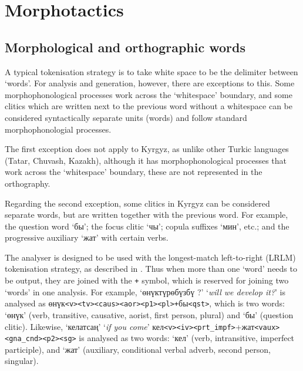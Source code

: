 \documentclass[10pt,a4paper,twocolumn]{article}
\newcommand{\eng}[1]{`{\em #1}'}
\begin{document}

\section{Morphotactics}


\subsection{Morphological and orthographic words}
A typical tokenisation strategy is to take white space to be the delimiter between `words'.  For analysis and generation, however, there are exceptions to this.  Some morphophonological processes work across the `whitespace' boundary, and some clitics which are written next to the previous word without a whitespace can be considered syntactically separate units (words) and follow standard morphophonologial processes.

The first exception does not apply to Kyrgyz, as unlike other Turkic languages (Tatar, Chuvash, Kazakh), although it has morphophonological processes that work across the `whitespace' boundary, these are not represented in the orthography.

Regarding the second exception, some clitics in Kyrgyz can be considered separate words, but are written together with the previous word. For example, the question word `бы'; the focus clitic `чы'; copula suffixes `мин', etc.; and the progressive auxiliary `жат' with certain verbs.

The analyser is designed to be used with the longest-match left-to-right (LRLM) tokenisation strategy, as described in \cite{garrido-alenda02}. Thus when more than one `word' needs to be output, they are joined with the \texttt{+} symbol, which is reserved for joining two `words' in one analysis.  For example, `өнүктүрөбүзбү ?' \eng{will we develop it?} is analysed as 
өнүк{\tt {\small <v><tv><caus><aor><p1><pl>+}}бы{\tt {\small <qst>}}, which is two words: `өнүк' (verb, transitive, causative, aorist, first person, plural) and `бы' (question clitic).  Likewise, `келатсаң' \eng{if you come} кел{\tt {\small <v><iv><prt\_impf>}}+жат\texttt{{\small <vaux><gna\_cnd><p2><sg>}} is analysed as two words: `кел' (verb, intransitive, imperfect participle), and `жат' (auxiliary, conditional verbal adverb, second person, singular).
\end{document}
